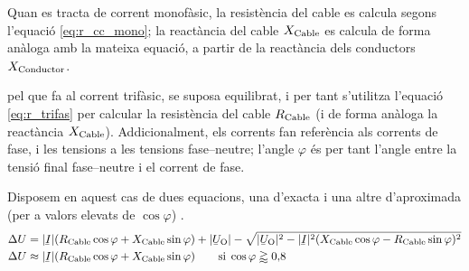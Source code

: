 Quan es tracta de corrent monof\`{a}sic, la resist\`{e}ncia del cable es calcula segons l'equaci\'{o}
\eqref{eq:r_cc_mono}; la react\`{a}ncia del cable $X_\mathrm{Cable}$ es calcula de forma an\`{a}loga
amb la mateixa equaci\'{o}, a partir de la react\`{a}ncia dels conductors $X_\mathrm{Conductor}$.

pel que fa al corrent trif\`{a}sic, se suposa equilibrat, i per tant s'utilitza l'equaci\'{o}
\eqref{eq:r_trifas} per calcular la resist\`{e}ncia del cable $R_\mathrm{Cable}$ (i de forma
an\`{a}loga la react\`{a}ncia $X_\mathrm{Cable}$). Addicionalment, els corrents fan refer\`{e}ncia als
corrents de fase, i les tensions a les tensions fase--neutre; l'angle $\varphi$ \'{e}s per
tant l'angle entre la tensi\'{o} final fase--neutre i el corrent de fase.

Disposem en aquest cas de dues equacions, una d'exacta i una altre d'aproximada (per a valors elevats de $\cos \varphi$) .
\begin{subequations}
\begin{align}
   \Delta U &= |\cmplx{I}| ( R\ped{Cable} \cos \varphi + X\ped{Cable} \sin \varphi) + |\cmplx{U}\ped{O}| - \sqrt{|\cmplx{U}\ped{O}|^2 - |\cmplx{I}|^2 ( X\ped{Cable} \cos \varphi - R\ped{Cable} \sin \varphi )^2} \label{eq:cdt_trif_exact} \\
   \Delta U &\approx |\cmplx{I}| ( R\ped{Cable} \cos \varphi + X\ped{Cable} \sin \varphi) \qquad \text{si} \; \cos \varphi \gtrapprox 0{,}8 \label{eq:cdt_trif_aprox}
\end{align}
\end{subequations}

